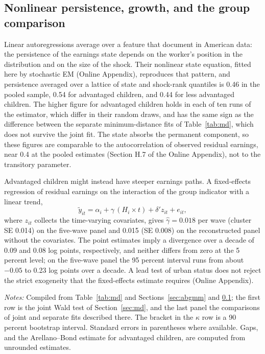\documentclass[11pt]{article}
\begin{document}
\subsection{Nonlinear persistence, growth, and the group comparison}
\label{sec:abb}

Linear autoregressions average over a feature that
\citet{ArellanoBlundellBonhomme2017} document in American data: the
persistence of the earnings state depends on the worker's position in
the distribution and on the size of the shock. Their nonlinear state equation, fitted here by stochastic EM (Online Appendix), reproduces that pattern, and persistence averaged over a lattice of state and shock-rank quantiles is 0.46 in the pooled sample, 0.54 for advantaged children, and 0.44 for less advantaged children. The higher figure for advantaged children holds in each of ten runs of the estimator, which differ in their random draws, and has the same sign as the difference between the separate minimum-distance fits of Table~\ref{tab:md}, which does not survive the joint fit. The state absorbs the permanent component, so these figures are comparable to the autocorrelation of observed residual earnings, near 0.4 at the pooled estimates (Section H.7 of the Online Appendix), not to the transitory parameter.

Advantaged children might instead have steeper earnings paths. A fixed-effects regression of residual earnings on the interaction of the group indicator with a linear trend,
\begin{equation}
\tilde y_{it} = \alpha_i + \gamma\,(H_i \times t) + \delta' z_{it} + e_{it},
\label{eq:fe}
\end{equation}
where $z_{it}$ collects the time-varying covariates, gives $\hat\gamma = 0.018$ per wave (cluster SE 0.014) on the five-wave panel and 0.015 (SE 0.008) on the reconstructed panel without the covariates. The point estimates imply a divergence over a decade of 0.09 and 0.08 log points, respectively, and neither differs from zero at the 5 percent level; on the five-wave panel the 95 percent interval runs from about $-0.05$ to 0.23 log points over a decade. A lead test of urban status \citep[Section~10.7.1]{Wooldridge2010} does not reject the strict exogeneity that the fixed-effects estimate requires (Online Appendix).

\begin{table}[t]
\centering
\small
\caption{Group comparison across process moments.}
\label{tab:summary}

\par\smallskip
\begin{minipage}{0.92\textwidth}
\footnotesize\emph{Notes:} Compiled from Table~\ref{tab:md} and Sections~\ref{sec:abgmm} and \ref{sec:abb}; the first row is the joint Wald test of Section~\ref{sec:md}, and the last panel the comparisons of joint and separate fits described there. The bracket in the $\kappa$ row is a 90 percent bootstrap interval. Standard errors in parentheses where available. Gaps, and the Arellano--Bond estimate for advantaged children, are computed from unrounded estimates.
\end{minipage}
\end{table}
\end{document}
